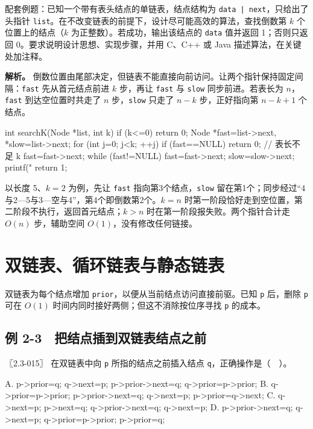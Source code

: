 \begin{example}[配套例题]

配套例题：已知一个带有表头结点的单链表，结点结构为 \texttt{data | next}，只给出了头指针 \texttt{list}。在不改变链表的前提下，设计尽可能高效的算法，查找倒数第 \(k\) 个位置上的结点（\(k\) 为正整数）。若成功，输出该结点的 \texttt{data} 值并返回 1；否则只返回 0。要求说明设计思想、实现步骤，并用 C、C++ 或 Java 描述算法，在关键处加注释。

\end{example}

\textbf{解析。} 倒数位置由尾部决定，但链表不能直接向前访问。让两个指针保持固定间隔：\texttt{fast} 先从首元结点前进 \(k\) 步，再让 \texttt{fast} 与 \texttt{slow} 同步前进。若表长为 \(n\)，\texttt{fast} 到达空位置时共走了 \(n\) 步，\texttt{slow} 只走了 \(n-k\) 步，正好指向第 \(n-k+1\) 个结点。

\begin{codeblock}[language=C]
int searchK(Node *list, int k) {
    if (k<=0) return 0;
    Node *fast=list->next, *slow=list->next;
    for (int j=0; j<k; ++j) {
        if (fast==NULL) return 0;   // 表长不足 k
        fast=fast->next;
    }
    while (fast!=NULL) {
        fast=fast->next;
        slow=slow->next;
    }
    printf("%
    return 1;
}
\end{codeblock}

以长度 5、\(k=2\) 为例，先让 \texttt{fast} 指向第3个结点，\texttt{slow} 留在第1个；同步经过``4与2---5与3---空与4''，第4个即倒数第2个。\(k=n\) 时第一阶段恰好走到空位置，第二阶段不执行，返回首元结点；\(k>n\) 时在第一阶段报失败。两个指针合计走 \(O(n)\) 步，辅助空间 \(O(1)\)，没有修改任何链接。

\section{双链表、循环链表与静态链表}\label{DS02-04}

双链表为每个结点增加 \texttt{prior}，以便从当前结点访问直接前驱。已知 \texttt{p} 后，删除 \texttt{p} 可在 \(O(1)\) 时间内同时接好两侧；但这不消除按位序寻找 \texttt{p} 的成本。

\subsection{例 2-3　把结点插到双链表结点之前}\label{DS02-ex3}

\begin{example}[配套例题]

〖2.3-015〗 在双链表中向 \texttt{p} 所指的结点之前插入结点 \texttt{q}，正确操作是（　）。

\begin{codeblock}[language={}]
A. p->prior=q; q->next=p;
   p->prior->next=q; q->prior=p->prior;
B. q->prior=p->prior; p->prior->next=q;
   q->next=p; p->prior=q->next;
C. q->next=p; p->next=q;
   q->prior->next=q; q->next=p;
D. p->prior->next=q; q->next=p;
   q->prior=p->prior; p->prior=q;
\end{codeblock}

\end{example}

